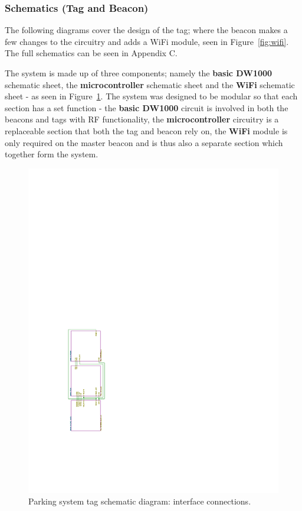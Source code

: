 \subsubsection{Schematics (Tag and Beacon)}

The following diagrams cover the design of the tag; where the beacon makes a few changes to the circuitry and adds a WiFi module, seen in Figure~\ref{fig:wifi}. The full schematics can be seen in Appendix C.

The system is made up of three components; namely the \textbf{basic DW1000} schematic sheet, the \textbf{microcontroller} schematic sheet and the \textbf{WiFi} schematic sheet - as seen in Figure~\ref{fig:interface-conn}. The system was designed to be modular so that each section has a set function - the \textbf{basic DW1000} circuit is involved in both the beacons and tags with RF functionality, the \textbf{microcontroller} circuitry is a replaceable section that both the tag and beacon rely on, the \textbf{WiFi} module is only required on the master beacon and is thus also a separate section which together form the system.

\begin{figure}[H]
\begin{center}
\includegraphics[page=1,scale=1.5,trim={3cm 5cm 15cm 13cm},clip,angle=-90]{data/parking-system2.pdf}
\caption{Parking system tag schematic diagram: interface connections.}
\label{fig:interface-conn}
\end{center}
\end{figure}

